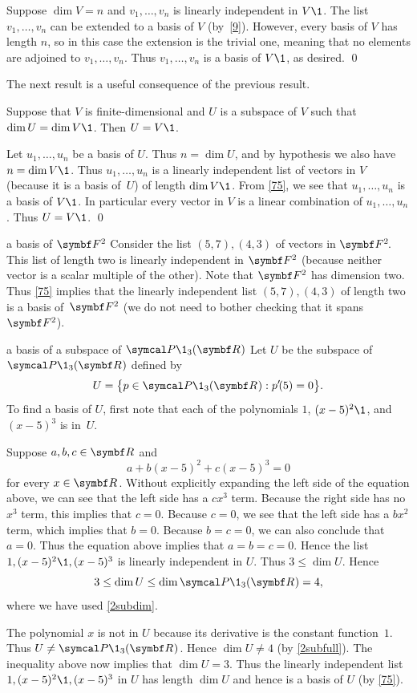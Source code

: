 \proof
Suppose $\dim V = n$ and $v_1, \dots, v_n$ is linearly independent in $V\1$.
The list $v_1, \dots, v_n$ can be extended to a basis of $V$ (by~\ref{9}).
However, every basis of $V$ has length $n$, so in this case the extension is the trivial one, meaning that no elements are adjoined to
$v_1, \dots, v_n$. Thus $v_1, \dots, v_n$ is a basis of $V\1$, as desired.
\qed

The next result is a useful consequence of the previous result.

{Suppose that $V$ is finite-dimensional and $U$ is a subspace of $V$ such that
$\dim U = \dim V\1$.  Then $U = V\1$.}

\proof
Let $u_1, \dots, u_n$ be a basis of $U$.  Thus $n = \dim U$, and by hypothesis
we also have $n = \dim V\1$.  Thus $u_1, \dots, u_n$ is a linearly
independent list of vectors in $V$ (because it is a basis of~$U$) of length
$\dim V\1$.  {}From \ref{75}, we see that $u_1, \dots, u_n$ is a basis of $V\1$.
In particular every vector in $V$ is a linear combination of
$u_1, \dots, u_n$.  Thus $U = V\1$.
\qed

\pagebreak[3]

\begin{example}{a basis of\/ $\F{2}$}
Consider the list $(5, 7), (4, 3)$ of vectors in $\FF2$.
This list of length two is linearly independent in $\F2$ (because neither vector is a
scalar multiple of the other).  Note that $\F{2}$ has dimension two. Thus
\ref{75} implies that the linearly independent list $(5, 7), (4, 3)$ of
length two is a basis of~$\F{2}$ (we do not need to bother checking
that it spans~$\F{2}$).
\end{example}

\begin{example}[basissub]{a basis of a subspace of\/ $\P\1_3(\R{})$}
Let $U$ be the subspace of $\P\1_3(\R{})$ defined by
\[
U = \br[\big]{p \in \P\1_3(\R{}): p' \! (5) = 0}.
\]
To find a basis of $U$, first note that each of the polynomials $1$, $(x - 5)^2\1$, and $(x-5)^3$ is in~$U$.

Suppose $a, b, c \in \R{}$ and
\[
a + b(x-5)^2 + c(x-5)^3 = 0
\]
for every $x \in \R{}$. Without explicitly expanding the left side of the equation above, we can see that the left side has a $cx^3$ term. Because the right side has no $x^3$ term, this implies that $c = 0$. Because $c = 0$, we see that the left side has a $bx^2$ term, which implies that $b = 0$. Because $b = c = 0$, we can also conclude that $a = 0$. Thus the equation above implies that $a = b = c = 0$. Hence the list $ 1, (x - 5)^2\1, (x-5)^3 $ is linearly independent in $U$. Thus $3 \le \dim U$.
Hence
\[
3 \le \dim U \le \dim \P\1_3(\R{}) = 4,
\]
where we have used \ref{2subdim}.

The polynomial $x$ is not in $U$ because its derivative is the constant function~$1$. Thus $U \ne \P\1_3(\R{})$. Hence
$\dim U \ne 4$ (by \ref{2subfull}). The inequality above now implies that $\dim U = 3$. Thus the linearly independent list $1, (x - 5)^2\1, (x-5)^3 $ in $U$ has length $\dim U$ and hence is a basis of $U$ (by \ref{75}).
\end{example}

